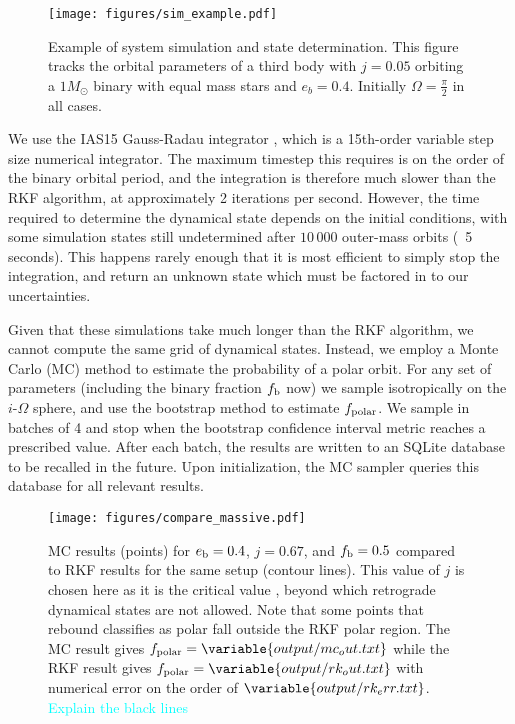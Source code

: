 \documentclass[twocolumn]{aastex631}
\newcommand{\RGM}[1]{\textcolor{cyan}{#1}}
\begin{document}
\begin{figure}
    \begin{centering}
        \texttt{[image: figures/sim\_example.pdf]}
        \caption{Example of system simulation and state determination. This figure tracks the orbital parameters
        of a third body with $j=0.05$ orbiting a $1 M_\odot$ binary with equal mass stars and $e_b = 0.4$.
        Initially $\Omega = \frac{\pi}{2}$ in all cases.}
        \label{fig:sim_example}
    \end{centering}
\end{figure}

We use the IAS15 Gauss-Radau integrator \citep{reboundias15}, which is a 15th-order variable step size numerical integrator. The maximum timestep this requires is on the order of the binary orbital period, and the integration is therefore much slower than the RKF algorithm, at approximately 2 iterations per second. However, the time required to determine the dynamical state depends on the initial conditions, with some simulation states still undetermined after $10\,000$ outer-mass orbits (~5 seconds). This happens rarely enough that it is most efficient to simply stop the integration, and return an unknown state which must be factored in to our uncertainties.

Given that these simulations take much longer than the RKF algorithm, we cannot compute the same grid of dynamical states. Instead, we employ a Monte Carlo (MC) method to estimate the probability of a polar orbit. For any set of parameters (including the binary fraction $f_{\rm b}$ now) we sample isotropically on the $i$-$\Omega$ sphere, and use the bootstrap method to estimate $f_{\rm polar}$. We sample in batches of 4 and stop when the bootstrap confidence interval metric reaches a prescribed value. After each batch, the results are written to an SQLite database to be recalled in the future. Upon initialization, the MC sampler queries this database for all relevant results.


\begin{figure}
    \begin{centering}
        \texttt{[image: figures/compare\_massive.pdf]}
        \caption{
            MC results (points) for $e_{\rm b}=0.4$, $j=0.67$, and $f_{\rm b}=0.5$ compared to RKF results for the same setup (contour lines). This value of $j$ is chosen here as it is the critical value \citep[see][]{martin2019,abod2022}, beyond which retrograde dynamical states are not allowed.
            Note that some points that {\sc rebound} classifies as polar fall outside the RKF polar region.
            The MC result gives $f_{\text{polar}} = \variable{output/mc_out.txt}$ while the RKF result gives $f_{\text{polar}} = \variable{output/rk_out.txt}$ with
            numerical error on the order of $\variable{output/rk_err.txt}$. \RGM{Explain the black lines}
        }
        \label{fig:rkf}
    \end{centering}
\end{figure}
\end{document}
